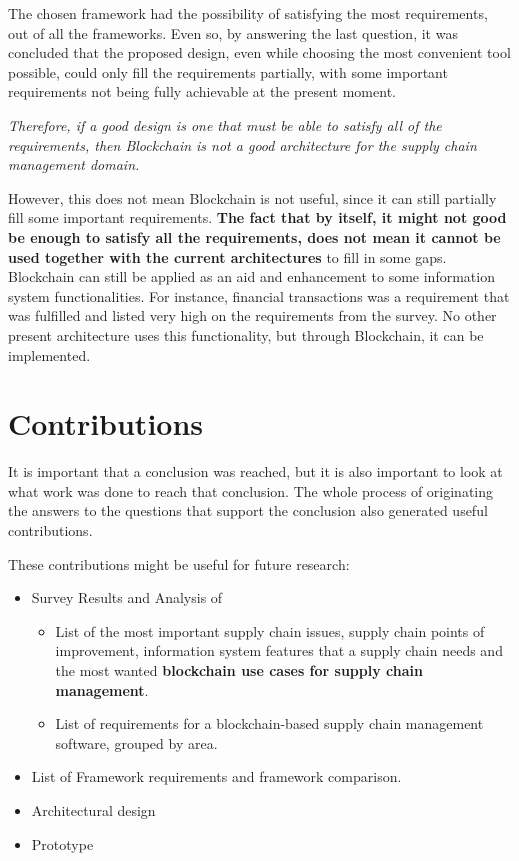 \par The chosen framework had the possibility of satisfying the most requirements, out of all the frameworks. Even so, by answering the last question, it was concluded that the proposed design, even while choosing the most convenient tool possible, could only fill the requirements partially, with some important requirements not being fully achievable at the present moment.


\emph{Therefore, if a good design is one that must be able to satisfy all of the requirements, then Blockchain is not a good architecture for the supply chain management domain.}


However, this does not mean Blockchain is not useful, since it can still partially fill some important requirements. \textbf{The fact that by itself, it might not good be enough to satisfy all the requirements, does not mean it cannot be used together with the current architectures} to fill in some gaps. Blockchain can still be applied as an aid and enhancement to some information system functionalities. For instance, financial transactions was a requirement that was fulfilled and listed very high on the requirements from the survey. No other present architecture uses this functionality, but through Blockchain, it can be implemented.

\section{Contributions}
It is important that a conclusion was reached, but it is also important to look at what work was done to reach that conclusion. The whole process of originating the answers to the questions that support the conclusion also generated useful contributions. 

These contributions might be useful for future research:

\begin{itemize}
	\item Survey Results and Analysis of
	\begin{itemize}
		\item List of the most important supply chain issues, supply chain points of improvement, information system features that a supply chain needs and the most wanted \textbf{blockchain use cases for supply chain management}.
		\item List of requirements for a blockchain-based supply chain management software, grouped by area.
	\end{itemize}
	\item List of Framework requirements and framework comparison.
	\item Architectural design
	\item Prototype
\end{itemize}

